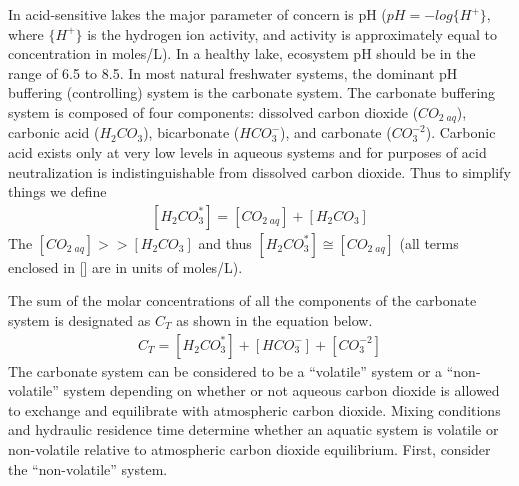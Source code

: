 \documentclass[letterpaper,10pt,english]{sphinxmanual}
\begin{document}
In acid-sensitive lakes the major parameter of concern is pH (\(pH = -log{\{H^+\}}\), where \(\{H^+\}\) is the hydrogen ion activity, and activity is approximately equal to concentration in moles/L). In a healthy lake, ecosystem pH should be in the range of 6.5 to 8.5. In most natural freshwater systems, the dominant pH buffering (controlling) system is the carbonate system. The carbonate buffering system is composed of four components: dissolved carbon dioxide (\({CO}_{{2\; aq}}\)), carbonic acid (\({H}_{{2}} {CO}_{{3}}\)), bicarbonate (\({HCO}_{{3}}^{{-}}\)), and carbonate (\({CO}_{{3}}^{{-2}}\)). Carbonic acid exists only at very low levels in aqueous systems and for purposes of acid neutralization is indistinguishable from dissolved carbon dioxide. Thus to simplify things we define
\begin{equation}\label{equation:Acid_Rain/Acid_Rain:eq_total_carbonic}
\begin{split}\left[{H}_{{2}} {CO}_{{3}}^{{*}} \right]=\left[{CO}_{{2\; aq}} \right]+\left[{H}_{{2}} {CO}_{{3}} \right]\end{split}
\end{equation}
The \(\left[{CO}_{{2\; aq}} \right] \mathrm{>} \mathrm{>} \left[{H}_{{2}} {CO}_{{3}} \right]\) and thus \(\left[{H}_{{2}} {CO}_{{3}}^{{*}} \right]\cong \left[{CO}_{{2\; aq}} \right]\) (all terms enclosed in {[}{]} are in units of moles/L).

The sum of the molar concentrations of all the components of the carbonate system is designated as \(C_T\) as shown in the equation below.
\begin{equation}\label{equation:Acid_Rain/Acid_Rain:Acid_Rain/Acid_Rain:0}
\begin{split}C_T = \left[H_2{CO}_3^* \right] + \left[{HCO}_3^- \right]+\left[{CO}_3^{-2} \right]\end{split}
\end{equation}
The carbonate system can be considered to be a “volatile” system or a “non-volatile” system depending on whether or not aqueous carbon dioxide is allowed to exchange and equilibrate with atmospheric carbon dioxide. Mixing conditions and hydraulic residence time determine whether an aquatic system is volatile or non-volatile relative to atmospheric carbon dioxide equilibrium. First, consider the “non-volatile” system.
\end{document}
